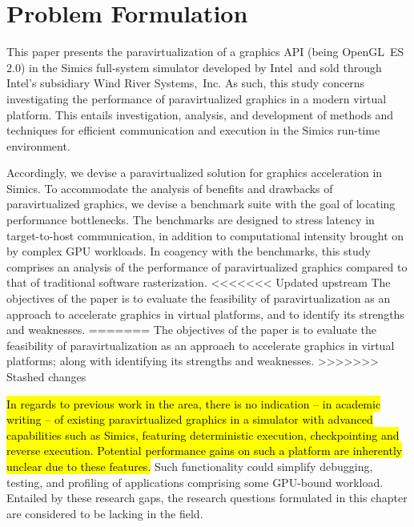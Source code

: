 
\section{Problem Formulation}
\label{sec:problemformulation}
This paper presents the paravirtualization of a graphics API (being OpenGL~ES~$2.0$) in the Simics full-system simulator developed by Intel\circledR\ and sold through Intel\circledR 's subsidiary Wind River Systems,~Inc. 
As such, this study concerns investigating the performance of paravirtualized graphics in a modern virtual platform.
This entails investigation, analysis, and development of methods and techniques for efficient communication and execution in the Simics run-time environment.

Accordingly, we devise a paravirtualized solution for graphics acceleration in Simics.
To accommodate the analysis of benefits and drawbacks of paravirtualized graphics, we devise a benchmark suite with the goal of locating performance bottlenecks.
The benchmarks are designed to stress latency in target-to-host communication, in addition to computational intensity brought on by complex GPU workloads.
In coagency with the benchmarks, this study comprises an analysis of the performance of paravirtualized graphics compared to that of traditional software rasterization.
<<<<<<< Updated upstream
The objectives of the paper is to evaluate the feasibility of paravirtualization as an approach to accelerate graphics in virtual platforms, and to identify its strengths and weaknesses.
=======
The objectives of the paper is to evaluate the feasibility of paravirtualization as an approach to accelerate graphics in virtual platforms; along with identifying its strengths and weaknesses.
>>>>>>> Stashed changes

\hl{In regards to previous work in the area, there is no indication -- in academic writing -- of existing paravirtualized graphics in a simulator with advanced capabilities such as Simics, featuring deterministic execution, checkpointing and reverse execution.
Potential performance gains on such a platform are inherently unclear due to these features.}
Such functionality could simplify debugging, testing, and profiling of applications comprising some GPU-bound workload.
Entailed by these research gaps, the research questions formulated in this chapter are considered to be lacking in the field.

